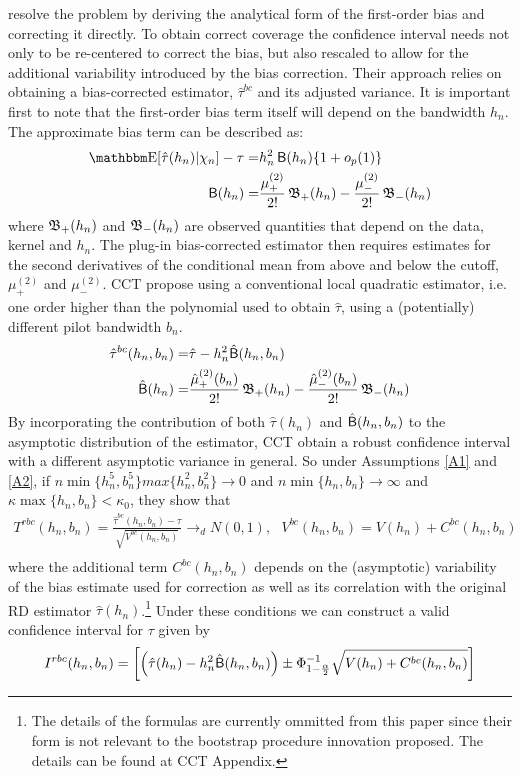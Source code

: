 \documentclass[12pt,fleqn]{article}
\begin{document}
\cite{calonico2014} resolve the problem by deriving the analytical form of the first-order bias and correcting it directly. To obtain correct coverage the confidence interval needs not only to be re-centered to correct the bias, but also rescaled to allow for the additional variability introduced by the bias correction. Their approach relies on obtaining a bias-corrected  estimator, $\hat{\tau}^{bc}$ and its adjusted variance. It is important first to note that the first-order bias term itself will depend on the bandwidth $h_{n}$. The approximate bias term can be described as:
\begin{align*}
     \E[\hat{\tau}(h_{n})|\chi_{n}]-\tau=& h_{n}^{2}\Bs(h_{n})\{1+o_{p}(1)\}\\
     \Bs(h_{n})=&\frac{\mu_{+}^{(2)}}{2!}\Bf_{+}(h_{n})-\frac{\mu_{-}^{(2)}}{2!}\Bf_{-}(h_{n})
   \end{align*}
where $\operatorname{\mathfrak{B}}_{+}(h_{n})$ and $\operatorname{\mathfrak{B}}_{-}(h_{n})$ are observed quantities that depend on the data, kernel and $h_{n}$. The plug-in bias-corrected estimator then requires estimates for the second derivatives of the conditional mean from above and below the cutoff, $\mu_{+}^{(2)}$ and $\mu_{-}^{(2)}$. CCT propose using a conventional local quadratic estimator, i.e. one order higher than the polynomial used to obtain $\hat{\tau}$,  using a (potentially) different pilot bandwidth $b_{n}$.
\begin{align*}
     \hat{\tau}^{bc}(h_{n}, b_{n})=& \hat{\tau}-h_{n}^{2}\hat{\operatorname{\mathsf{B}}}(h_{n},b_{n})\\
     \hat{\operatorname{\mathsf{B}}}(h_{n})=&\frac{\hat{\mu}_{+}^{(2)}(b_{n})}{2!}\operatorname{\mathfrak{B}}_{+}(h_{n})-\frac{\hat{\mu}_{-}^{(2)}(b_{n})}{2!}\operatorname{\mathfrak{B}}_{-}(h_{n})
   \end{align*}
By incorporating the contribution of both $\hat{\tau}(h_{n})$ and $\hat{\operatorname{\mathsf{B}}}(h_{n},b_{n})$ to the asymptotic distribution of the estimator, CCT obtain a robust confidence interval with a different asymptotic variance in general. So under Assumptions \ref{A1} and \ref{A2}, if $n\min\{h_{n}^{5}, b_{n}^{5}\}max\{h_{n}^{2}, b_{n}^{2}\}\rightarrow 0$ and $n\min\{h_{n}, b_{n}\}\rightarrow \infty$ and $\kappa \max\{h_{n},b_{n}\}< \kappa_{0}$, they show that
\begin{align}
  T^{rbc}(h_{n}, b_{n})=\frac{\hat{\tau}^{bc}(h_{n}, b_{n})-\tau}{\sqrt{V^{bc}(h_{n}, b_{n})}}\rightarrow_{d}N(0,1), \text{        }V^{bc}(h_{n}, b_{n})=V(h_{n})+C^{bc}(h_{n}, b_{n})\\
 \end{align}
where the additional term $C^{bc}(h_{n}, b_{n})$ depends on the (asymptotic) variability of the bias estimate used for correction as well as its correlation with the original RD estimator $\hat{\tau}(h_{n})$.\footnote{The details of the formulas are currently ommitted from this paper since their form is not relevant to the bootstrap procedure innovation proposed. The details can be found at CCT Appendix.}  Under these conditions we can construct a valid confidence interval for $\tau$ given by
 \begin{align}
  I^{rbc}(h_{n}, b_{n})=\left[\left(\hat{\tau}(h_{n})-h_{n}^{2}\hat{\operatorname{\mathsf{B}}}(h_{n},b_{n})\right)\pm \Phi^{-1}_{1-\frac{\alpha}{2}}\sqrt{V(h_{n})+C^{bc}(h_{n}, b_{n})} \right]
 \end{align}
\end{document}
